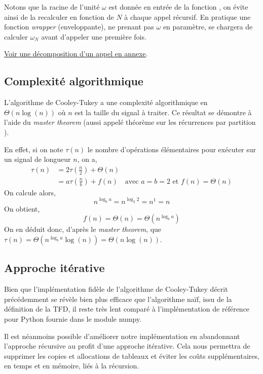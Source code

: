 Notons que la racine de l'unité $\omega$ est donnée en entrée de la fonction \FFT, on évite ainsi de la recalculer en fonction de $N$ à chaque appel récursif. En pratique une fonction \textit{wrapper} (enveloppante), ne prenant pas $\omega$ en paramètre, se chargera de calculer $\omega_N$ avant d'appeler \FFT une première fois.

\hyperref[exemple-cooley]{Voir une décomposition d'un appel en annexe}.

\subsection{Complexité algorithmique}

L'algorithme de Cooley-Tukey a une complexité algorithmique en $\Theta \left( n \log \left( n \right) \right)$ où $n$ est la taille du signal à traiter. Ce résultat se démontre à l'aide du \textit{master theorem}\cite{wiki-master-theorem} (aussi appelé \og théorème sur les récurrences par partition \fg). 

En effet, si on note $\tau \left( n \right)$ le nombre d'opérations élémentaires pour exécuter \FFT sur un signal de longueur $n$, on a,
\begin{align*}
\tau \left( n \right) &= 2 \tau \left( \frac{n}{2} \right) + \Theta \left( n \right) \\
&= a \tau \left( \frac{n}{b} \right) + f \left( n \right) \quad \text{avec $a = b = 2$ et $f \left( n \right) = \Theta \left( n \right)$}
\end{align*}
On calcule alors,
$$
n^{\log_b{a}} = n^{\log_2{2}} = n^1 = n
$$
On obtient,
$$
f \left( n \right) = \Theta \left( n \right) = \Theta \left( n^{\log_b{a}} \right)
$$
On en déduit donc, d'après le \textit{master theorem}, que $\tau \left( n \right) = \Theta \left( n^{\log_b{a}} \log \left( n \right) \right) = \Theta \left( n \log \left( n \right) \right)$.


\subsection{Approche itérative}
\label{section-approche-iterative}

Bien que l'implémentation fidèle de l'algorithme de Cooley-Tukey décrit précédemment se révèle bien plus efficace que l'algorithme naïf, issu de la définition de la TFD, il reste très lent comparé à l'implémentation de référence pour Python fournie dans le module numpy.

Il est néanmoins possible d'améliorer notre implémentation en abandonnant l'approche récursive au profit d'une approche itérative\cite{implementation-fft}. Cela nous permettra de supprimer les copies et allocations de tableaux et éviter les coûts supplémentaires, en temps et en mémoire, liés à la récursion.

